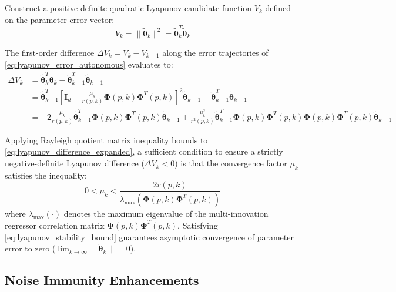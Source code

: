 Construct a positive-definite quadratic Lyapunov candidate function $V_k$ defined on the parameter error vector:
\begin{equation}
V_k = \|\tilde{\boldsymbol{\theta}}_k\|^2 = \tilde{\boldsymbol{\theta}}_k^T \tilde{\boldsymbol{\theta}}_k
\label{eq:lyapunov_candidate}
\end{equation}

The first-order difference $\Delta V_k = V_k - V_{k-1}$ along the error trajectories of \eqref{eq:lyapunov_error_autonomous} evaluates to:
\begin{align}
\Delta V_k &= \tilde{\boldsymbol{\theta}}_k^T \tilde{\boldsymbol{\theta}}_k - \tilde{\boldsymbol{\theta}}_{k-1}^T \tilde{\boldsymbol{\theta}}_{k-1} \nonumber \\
&= \tilde{\boldsymbol{\theta}}_{k-1}^T \left[ \mathbf{I}_d - \frac{\mu_k}{r(p, k)} \boldsymbol{\Phi}(p, k) \boldsymbol{\Phi}^T(p, k) \right]^2 \tilde{\boldsymbol{\theta}}_{k-1} - \tilde{\boldsymbol{\theta}}_{k-1}^T \tilde{\boldsymbol{\theta}}_{k-1} \nonumber \\
&= -2 \frac{\mu_k}{r(p, k)} \tilde{\boldsymbol{\theta}}_{k-1}^T \boldsymbol{\Phi}(p, k) \boldsymbol{\Phi}^T(p, k) \tilde{\boldsymbol{\theta}}_{k-1} + \frac{\mu_k^2}{r^2(p, k)} \tilde{\boldsymbol{\theta}}_{k-1}^T \boldsymbol{\Phi}(p, k) \boldsymbol{\Phi}^T(p, k) \boldsymbol{\Phi}(p, k) \boldsymbol{\Phi}^T(p, k) \tilde{\boldsymbol{\theta}}_{k-1}
\label{eq:lyapunov_difference_expanded}
\end{align}

Applying Rayleigh quotient matrix inequality bounds to \eqref{eq:lyapunov_difference_expanded}, a sufficient condition to ensure a strictly negative-definite Lyapunov difference ($\Delta V_k < 0$) is that the convergence factor $\mu_k$ satisfies the inequality:
\begin{equation}
0 < \mu_k < \frac{2 r(p, k)}{\lambda_{\max}\left( \boldsymbol{\Phi}(p, k) \boldsymbol{\Phi}^T(p, k) \right)}
\label{eq:lyapunov_stability_bound}
\end{equation}
where $\lambda_{\max}(\cdot)$ denotes the maximum eigenvalue of the multi-innovation regressor correlation matrix $\boldsymbol{\Phi}(p, k) \boldsymbol{\Phi}^T(p, k)$. Satisfying \eqref{eq:lyapunov_stability_bound} guarantees asymptotic convergence of parameter error to zero ($\lim_{k \to \infty} \|\tilde{\boldsymbol{\theta}}_k\| = 0$).


\subsection{Noise Immunity Enhancements}
\label{subsec:cf_misg_noise}

